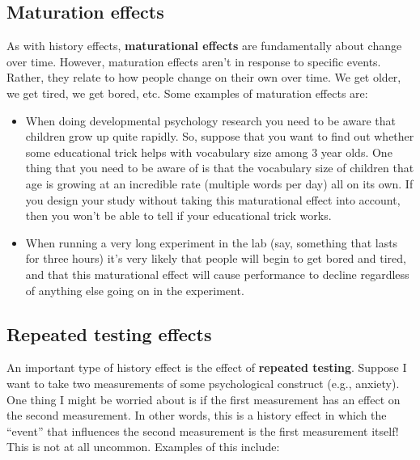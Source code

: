\documentclass[
  a4paper,
]{book}
\providecommand{\tightlist}{%
  \setlength{\itemsep}{0pt}\setlength{\parskip}{0pt}}\usepackage{longtable,booktabs,array}
\begin{document}
\hypertarget{maturation-effects}{%
\subsection{Maturation effects}\label{maturation-effects}}

As with history effects, \textbf{maturational effects} are fundamentally
about change over time. However, maturation effects aren't in response
to specific events. Rather, they relate to how people change on their
own over time. We get older, we get tired, we get bored, etc. Some
examples of maturation effects are:

\begin{itemize}
\tightlist
\item
  When doing developmental psychology research you need to be aware that
  children grow up quite rapidly. So, suppose that you want to find out
  whether some educational trick helps with vocabulary size among 3 year
  olds. One thing that you need to be aware of is that the vocabulary
  size of children that age is growing at an incredible rate (multiple
  words per day) all on its own. If you design your study without taking
  this maturational effect into account, then you won't be able to tell
  if your educational trick works.
\item
  When running a very long experiment in the lab (say, something that
  lasts for three hours) it's very likely that people will begin to get
  bored and tired, and that this maturational effect will cause
  performance to decline regardless of anything else going on in the
  experiment.
\end{itemize}

\hypertarget{repeated-testing-effects}{%
\subsection{Repeated testing effects}\label{repeated-testing-effects}}

An important type of history effect is the effect of \textbf{repeated
testing}. Suppose I want to take two measurements of some psychological
construct (e.g., anxiety). One thing I might be worried about is if the
first measurement has an effect on the second measurement. In other
words, this is a history effect in which the ``event'' that influences
the second measurement is the first measurement itself! This is not at
all uncommon. Examples of this include:
\end{document}
